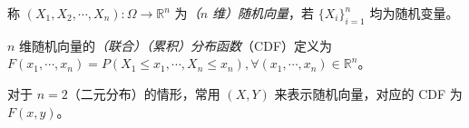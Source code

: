 \documentclass[../main.tex]{subfiles}
\begin{document}
\begin{definition}\label{def:3.1.1}
    称 $(X_1,X_2,\cdots,X_n):\Omega\rightarrow\mathbb R^n$ 为\emph{（$n$ 维）随机向量}，若 $\{X_i\}_{i=1}^n$ 均为随机变量。
\end{definition}

\begin{definition}\label{def:3.1.2}
    $n$ 维随机向量的\emph{（联合）（累积）分布函数}（CDF）定义为 $F(x_1,\cdots,x_n)=P(X_1\leq x_1,\cdots,X_n\leq x_n),\forall (x_1,\cdots,x_n)\in\mathbb R^n$。
\end{definition}

对于 $n=2$（二元分布）的情形，常用 $(X,Y)$ 来表示随机向量，对应的 CDF 为 $F(x,y)$。
\end{document}
